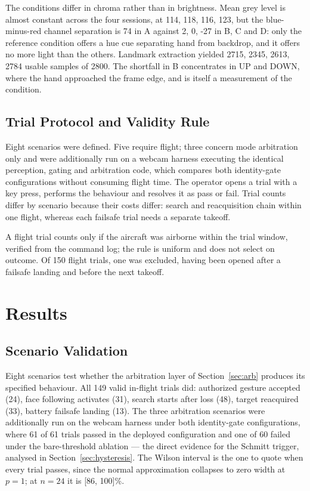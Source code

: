 \documentclass[conference]{IEEEtran}
\begin{document}
The conditions differ in chroma rather than in brightness. Mean grey level is
almost constant across the four sessions, at 114, 118, 116, 123, but the blue-minus-red channel
separation is 74 in A against 2, 0, -27 in B, C and D: only the reference condition
offers a hue cue separating hand from backdrop, and it offers no more light than
the others. Landmark extraction yielded 2715, 2345, 2613, 2784 usable samples of 2800. The shortfall in
B concentrates in UP and DOWN, where the hand approached the frame edge, and is
itself a measurement of the condition.

\subsection{Trial Protocol and Validity Rule}

Eight scenarios were defined. Five require flight; three concern mode arbitration
only and were additionally run on a webcam harness executing the identical
perception, gating and arbitration code, which compares both identity-gate
configurations without consuming flight time. The operator opens a trial with a
key press, performs the behaviour and resolves it as pass or fail. Trial counts
differ by scenario because their costs differ: search and reacquisition chain
within one flight, whereas each failsafe trial needs a separate takeoff.

A flight trial counts only if the aircraft was airborne within the trial window,
verified from the command log; the rule is uniform and does not select on
outcome. Of 150 flight trials, one was excluded, having been opened after a
failsafe landing and before the next takeoff.

\section{Results}
\label{sec:results}

\subsection{Scenario Validation}

Eight scenarios test whether the arbitration layer of
Section~\ref{sec:arb} produces its specified behaviour. All 149 valid in-flight
trials did: authorized gesture accepted (24), face following activates (31),
search starts after loss (48), target reacquired (33), battery failsafe landing
(13). The three arbitration scenarios were additionally run on the webcam
harness under both identity-gate configurations, where 61 of 61 trials passed in
the deployed configuration and one of 60 failed under the bare-threshold
ablation --- the direct evidence for the Schmitt trigger, analysed in
Section~\ref{sec:hysteresis}. The Wilson interval is the one to quote when every
trial passes, since the normal approximation collapses to zero width at $p=1$;
at $n=24$ it is [86, 100]\%.
\end{document}
